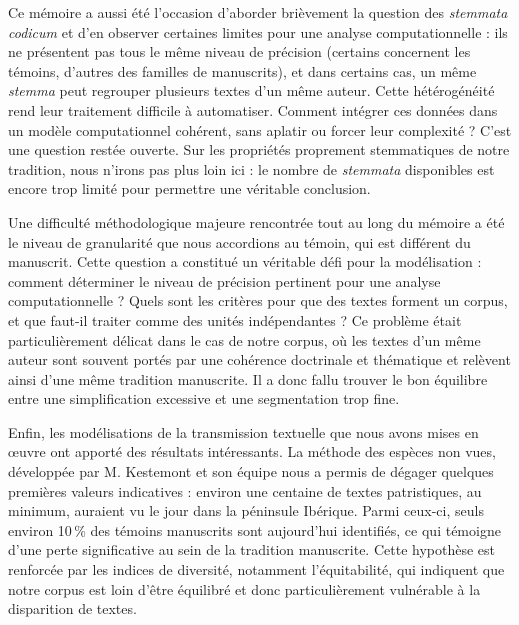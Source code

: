 \documentclass[a4paper,twoside,12pt]{book}
\begin{document}
Ce mémoire a aussi été l’occasion d’aborder brièvement la question des \textit{stemmata codicum} et d’en observer certaines limites pour une analyse computationnelle : ils ne présentent pas tous le même niveau de précision (certains concernent les témoins, d’autres des familles de manuscrits), et dans certains cas, un même \textit{stemma} peut regrouper plusieurs textes d’un même auteur. Cette hétérogénéité rend leur traitement difficile à automatiser. Comment intégrer ces données dans un modèle computationnel cohérent, sans aplatir ou forcer leur complexité ? C’est une question restée ouverte. Sur les propriétés proprement stemmatiques de notre tradition, nous n’irons pas plus loin ici : le nombre de \textit{stemmata} disponibles est encore trop limité pour permettre une véritable conclusion.

Une difficulté méthodologique majeure rencontrée tout au long du mémoire a été le niveau de granularité que nous accordions au témoin, qui est différent du manuscrit. Cette question a constitué un véritable défi pour la modélisation : comment déterminer le niveau de précision pertinent pour une analyse computationnelle ? Quels sont les critères pour que des textes forment un corpus, et que faut-il traiter comme des unités indépendantes ? Ce problème était particulièrement délicat dans le cas de notre corpus, où les textes d’un même auteur sont souvent portés par une cohérence doctrinale et thématique et relèvent ainsi d’une même tradition manuscrite. Il a donc fallu trouver le bon équilibre entre une simplification excessive et une segmentation trop fine.

Enfin, les modélisations de la transmission textuelle que nous avons mises en œuvre ont apporté des résultats intéressants. La méthode des espèces non vues, développée par M. Kestemont et son équipe nous a permis de dégager quelques premières valeurs indicatives : environ une centaine de textes patristiques, au minimum, auraient vu le jour dans la péninsule Ibérique. Parmi ceux-ci, seuls environ 10\,\% des témoins manuscrits sont aujourd’hui identifiés, ce qui témoigne d’une perte significative au sein de la tradition manuscrite. Cette hypothèse est renforcée par les indices de diversité, notamment l’équitabilité, qui indiquent que notre corpus est loin d’être équilibré et donc particulièrement vulnérable à la disparition de textes.
\end{document}
